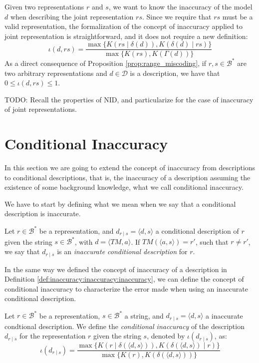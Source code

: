 Given two representations $r$ and $s$, we want to know the inaccuracy of the model $d$ when describing the joint representation $rs$. Since we require that $rs$ must be a valid representation, the formalization of the concept of inaccuracy applied to joint representation is straightforward, and it does not require a new definition:
\[
\iota(d, rs) = \frac{ \max\{ K \left(rs \mid \delta(d) \right), K \left( \delta(d) \mid rs \right) \} } { \max\{ K(rs), K \left(\Gamma(d) \right) \} }
\]
As a direct consequence of Proposition \ref{prop:range_miscoding}, if $r, s \in \mathcal{B}^\ast$ are two arbitrary representations and $d \in \mathcal{D}$ is a description, we have that $0 \leq \iota(d, rs) \leq 1$.

{\color{red} TODO: Recall the properties of NID, and particularize for the case of inaccuracy of joint representations.}

%
%

\section{Conditional Inaccuracy}

In this section we are going to extend the concept of inaccuracy from descriptions to conditional descriptions, that is, the inaccuracy of a description assuming the existence of some background knowledge, what we call conditional inaccuracy.

We have to start by defining what we mean when we say that a conditional description is inaccurate.

\begin{definition}
Let $r \in \mathcal{B}^\ast$ be a representation, and $d_{r \mid s} = \langle d, s \rangle$ a conditional description of $r$ given the string $s \in \mathcal{B}^\ast$, with $ d = \langle TM, a \rangle$. If $TM \left(\langle a, s \rangle \right) = r'$, such that $r \neq r'$, we say that $d_{r \mid s}$ is an \emph{inaccurate conditional description} for $r$.
\end{definition}

In the same way we defined the concept of inaccuracy of a description in Definition \ref{def:inaccuracy:inaccuracy:inaccuracy}, we can define the concept of conditional inaccuracy to characterize the error made when using an inaccurate conditional description.

\begin{definition}
Let $r \in \mathcal{B}^\ast$ be a representation, $s \in \mathcal{B}^\ast$ a string, and $d_{r \mid s} = \langle d, s \rangle$ a inaccurate condtional description. We define the \emph{conditional inaccuracy} of the description $d_{r \mid s}$ for the representation $r$ given the string $s$, denoted by $\iota(d_{r \mid s})$, as:
\[
\iota(d_{r \mid s}) = \frac{ \max\{ K \left(r \mid \delta(\langle d, s \rangle) \right), K \left( \delta(\langle d, s \rangle) \mid r \right) \} } { \max\{ K(r), K \left(\delta(\langle d, s \rangle) \right) \} }
\]
\end{definition}

